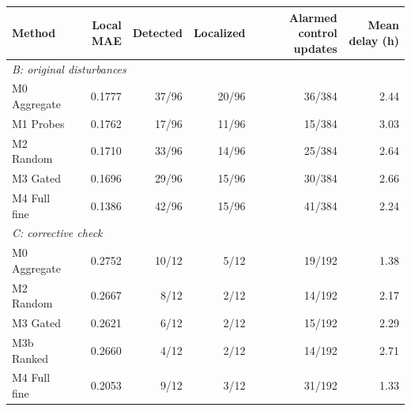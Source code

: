 \begin{tabular}{lrrrrr}\toprule
Method & Local MAE & Detected & Localized & Alarmed control updates & Mean delay (h)\\\midrule
\multicolumn{6}{l}{\textit{B: original disturbances}} \\
M0 Aggregate & 0.1777 & 37/96 & 20/96 & 36/384 & 2.44 \\
M1 Probes & 0.1762 & 17/96 & 11/96 & 15/384 & 3.03 \\
M2 Random & 0.1710 & 33/96 & 14/96 & 25/384 & 2.64 \\
M3 Gated & 0.1696 & 29/96 & 15/96 & 30/384 & 2.66 \\
M4 Full fine & 0.1386 & 42/96 & 15/96 & 41/384 & 2.24 \\
\multicolumn{6}{l}{\textit{C: corrective check}} \\
M0 Aggregate & 0.2752 & 10/12 & 5/12 & 19/192 & 1.38 \\
M2 Random & 0.2667 & 8/12 & 2/12 & 14/192 & 2.17 \\
M3 Gated & 0.2621 & 6/12 & 2/12 & 15/192 & 2.29 \\
M3b Ranked & 0.2660 & 4/12 & 2/12 & 14/192 & 2.71 \\
M4 Full fine & 0.2053 & 9/12 & 3/12 & 31/192 & 1.33 \\
\bottomrule\end{tabular}
